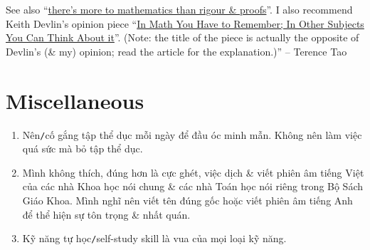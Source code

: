 \documentclass{article}
\numberwithin{equation}{section}
\begin{document}
See also ``\href{https://terrytao.wordpress.com/career-advice/theres-more-to-mathematics-than-rigour-and-proofs/}{there's more to mathematics than rigour \& proofs}''. I also recommend Keith Devlin's opinion piece ``\href{http://www.maa.org/external_archive/devlin/devlin_06_10.html}{In Math You Have to Remember; In Other Subjects You Can Think About it}''. (Note: the title of the piece is actually the opposite of Devlin's (\& my) opinion; read the article for the explanation.)'' -- Terence Tao


\section{Miscellaneous}

\begin{enumerate}
	\item Nên\texttt{/}cố gắng tập thể dục mỗi ngày để đầu óc minh mẫn. Không nên làm việc quá sức mà bỏ tập thể dục.
	\item Mình không thích, đúng hơn là cực ghét, việc dịch \& viết phiên âm tiếng Việt của các nhà Khoa học nói chung \& các nhà Toán học nói riêng trong Bộ Sách Giáo Khoa. Mình nghĩ nên viết tên đúng gốc hoặc viết phiên âm tiếng Anh để thể hiện sự tôn trọng \& nhất quán.
	\item Kỹ năng tự học\texttt{/}self-study skill là vua của mọi loại kỹ năng.
\end{enumerate}


\printbibliography[heading=bibintoc]
	
\end{document}
